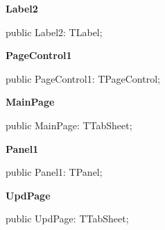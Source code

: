 \documentclass{report}
\newif\ifpdf
\begin{document}
\begin{list}{}
\par  \label{settings.TForm2-Label2}
\item[\textbf{Label2}\hfill]
\ifpdf
\begin{flushleft}
\fi
\begin{ttfamily}
public Label2: TLabel;\end{ttfamily}

\ifpdf
\end{flushleft}
\fi


\par  \label{settings.TForm2-PageControl1}
\item[\textbf{PageControl1}\hfill]
\ifpdf
\begin{flushleft}
\fi
\begin{ttfamily}
public PageControl1: TPageControl;\end{ttfamily}

\ifpdf
\end{flushleft}
\fi


\par  \label{settings.TForm2-MainPage}
\item[\textbf{MainPage}\hfill]
\ifpdf
\begin{flushleft}
\fi
\begin{ttfamily}
public MainPage: TTabSheet;\end{ttfamily}

\ifpdf
\end{flushleft}
\fi


\par  \label{settings.TForm2-Panel1}
\item[\textbf{Panel1}\hfill]
\ifpdf
\begin{flushleft}
\fi
\begin{ttfamily}
public Panel1: TPanel;\end{ttfamily}

\ifpdf
\end{flushleft}
\fi


\par  \label{settings.TForm2-UpdPage}
\item[\textbf{UpdPage}\hfill]
\ifpdf
\begin{flushleft}
\fi
\begin{ttfamily}
public UpdPage: TTabSheet;\end{ttfamily}

\ifpdf
\end{flushleft}
\fi


\par  \end{list}
\end{document}
